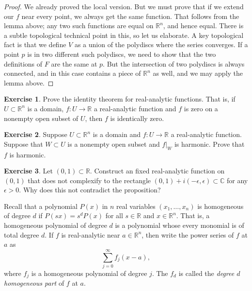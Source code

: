 \documentclass[12pt,openany]{book}
\newcommand{\C}{{\mathbb{C}}}
\newcommand{\R}{{\mathbb{R}}}
\newcommand{\myindex}[1]{#1\index{#1}}
\theoremstyle{plain}
\theoremstyle{remark}
\theoremstyle{definition}
\newenvironment{exbox}{%
    \def\FrameCommand{\vrule width 1pt \relax\hspace {10pt}}%
    \MakeFramed {\advance \hsize -\width \FrameRestore }%
}{%
    \endMakeFramed
}
\theoremstyle{exercise}
\newtheorem{exercise}{Exercise}[section]
\theoremstyle{example}
\begin{document}
\begin{proof}
We already proved the local version.  But we must prove that if we
extend our $f$ near every point, we always get the same function.
That follows from the lemma above; any two such functions are
equal on $\R^n$, and hence equal.  There is a subtle topological technical
point in this, so let us elaborate.  A key topological fact is that we define
$V$ as a union of the polydiscs where the series converges.  If
a point $p$ is in two different such polydiscs, we need to show that
the two definitions of $F$ are the same at $p$.  But the intersection
of two polydiscs is always connected, and in this case contains a piece
of $\R^n$ as well, and we may apply the lemma above.
\end{proof}

\begin{exbox}
\begin{exercise}
Prove the identity theorem for real-analytic functions.  That is, if $U
\subset \R^n$ is a domain, $f \colon U \to \R$ a real-analytic function and
$f$ is zero on a nonempty open subset of $U$, then $f$ is identically zero.
\end{exercise}

\begin{exercise}
Suppose $U \subset \R^n$ is a domain and $f \colon U \to \R$ a real-analytic
function.  Suppose that $W \subset U$ is a nonempty open subset and
$f|_W$ is harmonic.  Prove that $f$ is harmonic.
\end{exercise}

\begin{exercise}
Let $(0,1) \subset \R$.  Construct an fixed real-analytic function
on $(0,1)$ that does not complexify to the rectangle $(0,1) + i(-\epsilon,\epsilon)
\subset \C$ for any $\epsilon > 0$.  Why does this not contradict the
proposition?
\end{exercise}
\end{exbox}

Recall that a polynomial $P(x)$ in $n$ real variables $(x_1,\ldots,x_n)$ is homogeneous of degree $d$ if
$P(s x) = s^d P(x)$ for all $s \in \R$ and $x \in \R^n$.
That is, a homogeneous polynomial of degree $d$ is a polynomial whose
every monomial
is of total degree $d$.
If $f$ is real-analytic near $a \in \R^n$, then
write the power series of $f$ at $a$ as
\begin{equation*}
\sum_{j=0}^{\infty} f_j(x-a) ,
\end{equation*}
where $f_j$ is a homogeneous polynomial of degree $j$.  The $f_d$ is 
called the
\emph{\myindex{degree $d$ homogeneous part}} of $f$
at $a$.
\end{document}
